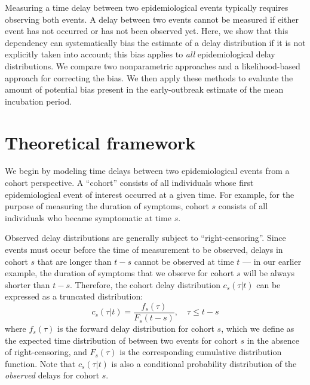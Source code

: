 \documentclass[12pt]{article}
\begin{document}
Measuring a time delay between two epidemiological events typically requires observing both events.
A delay between two events cannot be measured if either event has not occurred or has not been observed yet.
Here, we show that this dependency can systematically bias the estimate of a delay distribution if it is not explicitly taken into account;
this bias applies to \emph{all} epidemiological delay distributions.
We compare two nonparametric approaches and a likelihood-based approach for correcting the bias.
We then apply these methods to evaluate the amount of potential bias present in the early-outbreak estimate of the mean incubation period.

\section{Theoretical framework}

We begin by modeling time delays between two epidemiological events from a cohort perspective.
A ``cohort'' consists of all individuals whose first epidemiological event of interest occurred at a given time.
For example, for the purpose of measuring the duration of symptoms, cohort $s$ consists of all individuals who became symptomatic at time $s$.

Observed delay distributions are generally subject to ``right-censoring''.
Since events must occur before the time of measurement to be observed, delays in cohort $s$ that are longer than $t-s$ cannot be observed at time $t$ --- 
in our earlier example, the duration of symptoms that we observe for cohort $s$ will be always shorter than $t-s$.
Therefore, the cohort delay distribution $c_s(\tau|t)$ can be expressed as a truncated distribution:
\begin{equation}
c_s(\tau|t) = \frac{f_s(\tau)}{F_s(t-s)},\quad \tau \leq t-s
\label{eq:cohort}
\end{equation}
where $f_s(\tau)$ is the forward delay distribution for cohort $s$, which we define as the expected time distribution of between two events for cohort $s$ in the absence of right-censoring,
and $F_s(\tau)$ is the corresponding cumulative distribution function.
Note that $c_s(\tau|t)$ is also a conditional probability distribution of the \emph{observed} delays for cohort $s$.
\end{document}
